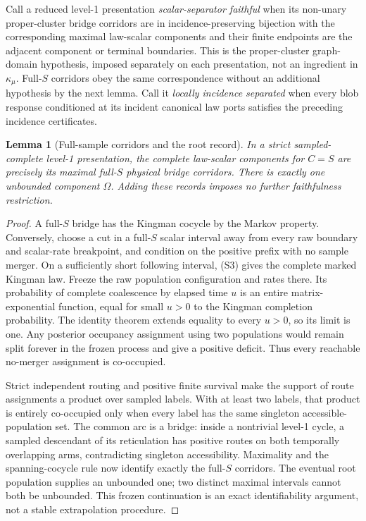 \documentclass[11pt]{article}
\newtheorem{lemma}[theorem]{Lemma}
\begin{document}
Call a reduced level-1 presentation \emph{scalar-separator faithful} when its non-unary proper-cluster bridge corridors are in incidence-preserving bijection with the corresponding maximal law-scalar components and their finite endpoints are the adjacent component or terminal boundaries.  This is the proper-cluster graph-domain hypothesis, imposed separately on each presentation, not an ingredient in $\kappa_\mu$.  Full-$S$ corridors obey the same correspondence without an additional hypothesis by the next lemma.  Call it \emph{locally incidence separated} when every blob response conditioned at its incident canonical law ports satisfies the preceding incidence certificates.

\begin{lemma}[Full-sample corridors and the root record]
\label{lem:full-s-corridor}
In a strict sampled-complete level-1 presentation, the complete law-scalar components for $C=S$ are precisely its maximal full-$S$ physical bridge corridors.  There is exactly one unbounded component $\Omega$.  Adding these records imposes no further faithfulness restriction.
\end{lemma}

\begin{proof}
A full-$S$ bridge has the Kingman cocycle by the Markov property.  Conversely, choose a cut in a full-$S$ scalar interval away from every raw boundary and scalar-rate breakpoint, and condition on the positive prefix with no sample merger.  On a sufficiently short following interval, (S3) gives the complete marked Kingman law.  Freeze the raw population configuration and rates there.  Its probability of complete coalescence by elapsed time $u$ is an entire matrix-exponential function, equal for small $u>0$ to the Kingman completion probability.  The identity theorem extends equality to every $u>0$, so its limit is one.  Any posterior occupancy assignment using two populations would remain split forever in the frozen process and give a positive deficit.  Thus every reachable no-merger assignment is co-occupied.

Strict independent routing and positive finite survival make the support of route assignments a product over sampled labels.  With at least two labels, that product is entirely co-occupied only when every label has the same singleton accessible-population set.  The common arc is a bridge: inside a nontrivial level-1 cycle, a sampled descendant of its reticulation has positive routes on both temporally overlapping arms, contradicting singleton accessibility.  Maximality and the spanning-cocycle rule now identify exactly the full-$S$ corridors.  The eventual root population supplies an unbounded one; two distinct maximal intervals cannot both be unbounded.  This frozen continuation is an exact identifiability argument, not a stable extrapolation procedure.
\end{proof}
\end{document}
